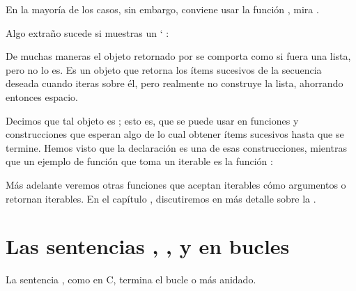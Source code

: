 \documentclass[a4,10pt,spanish]{sphinxmanual}
\begin{document}
\sphinxAtStartPar
En la mayoría de los casos, sin embargo, conviene usar la función , mira {\hyperref[\detokenize{tutorial/datastructures:tut-loopidioms}]{}}.

\sphinxAtStartPar
Algo extraño sucede si muestras un `    :

\begin{sphinxVerbatim}[commandchars=\\\{\}]
\end{sphinxVerbatim}

\sphinxAtStartPar
De muchas maneras el objeto retornado por  se comporta como si fuera una lista, pero no lo es. Es un objeto que retorna los ítems sucesivos de la secuencia deseada cuando iteras sobre él, pero realmente no construye la lista, ahorrando entonces espacio.

\sphinxAtStartPar
Decimos que tal objeto es {\hyperref[\detokenize{glossary:term-iterable}]{}}; esto es, que se puede usar en funciones y construcciones que esperan algo de lo cual obtener ítems sucesivos hasta que se termine. Hemos visto que la declaración  es una de esas construcciones, mientras que un ejemplo de función que toma un iterable es la función :

\begin{sphinxVerbatim}[commandchars=\\\{\}]
  
\end{sphinxVerbatim}

\sphinxAtStartPar
Más adelante veremos otras funciones que aceptan iterables cómo argumentos o retornan iterables. En el capítulo {\hyperref[\detokenize{tutorial/datastructures:tut-structures}]{}}, discutiremos en más detalle sobre la .


\section{Las sentencias , , y  en bucles}
\label{\detokenize{tutorial/controlflow:break-and-continue-statements-and-else-clauses-on-loops}}\label{\detokenize{tutorial/controlflow:tut-break}}
\sphinxAtStartPar
La sentencia , como en C, termina el bucle  o  más anidado.
\end{document}
